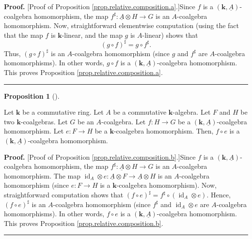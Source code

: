 \documentclass
[numbers=enddot,12pt,final,onecolumn,notitlepage,abstracton]{scrartcl}%
\theoremstyle{definition}
\newtheorem{prop}[theo]{Proposition}
\newenvironment{proposition}[1][]
{\begin{prop}[#1]\begin{leftbar}}
{\end{leftbar}\end{prop}}
\newenvironment{proof}[1][Proof]{\noindent\textbf{#1.} }{\ \rule{0.5em}{0.5em}}
\begin{document}
\begin{proof}
[Proof of Proposition \ref{prop.relative.composition.a}.]Since $f$ is a
$\left(  \mathbf{k},\underline{A}\right)  $-coalgebra homomorphism, the map
$f^{\sharp}:\underline{A}\otimes H\rightarrow G$ is an $A$-coalgebra
homomorphism. Now, straightforward elementwise computation (using the fact
that the map $f$ is $\mathbf{k}$-linear, and the map $g$ is $A$-linear) shows
that
\begin{equation}
\left(  g\circ f\right)  ^{\sharp}=g\circ f^{\sharp}.
\label{pf.prop.relative.composition.a.1}%
\end{equation}
Thus, $\left(  g\circ f\right)  ^{\sharp}$ is an $A$-coalgebra homomorphism
(since $g$ and $f^{\sharp}$ are $A$-coalgebra homomorphisms). In other words,
$g\circ f$ is a $\left(  \mathbf{k},\underline{A}\right)  $-coalgebra
homomorphism. This proves Proposition \ref{prop.relative.composition.a}.
\end{proof}

\begin{proposition}
\label{prop.relative.composition.b}Let $\mathbf{k}$ be a commutative ring. Let
$A$ be a commutative $\mathbf{k}$-algebra. Let $F$ and $H$ be two $\mathbf{k}%
$-coalgebras. Let $G$ be an $A$-coalgebra. Let $f:H\rightarrow G$ be a
$\left(  \mathbf{k},\underline{A}\right)  $-coalgebra homomorphism. Let
$e:F\rightarrow H$ be a $\mathbf{k}$-coalgebra homomorphism. Then, $f\circ e$
is a $\left(  \mathbf{k},\underline{A}\right)  $-coalgebra homomorphism.
\end{proposition}

\begin{proof}
[Proof of Proposition \ref{prop.relative.composition.b}.]Since $f$ is a
$\left(  \mathbf{k},\underline{A}\right)  $-coalgebra homomorphism, the map
$f^{\sharp}:\underline{A}\otimes H\rightarrow G$ is an $A$-coalgebra
homomorphism. The map $\operatorname*{id}\nolimits_{A}\otimes e:\underline{A}%
\otimes F\rightarrow\underline{A}\otimes H$ is an $A$-coalgebra homomorphism
(since $e:F\rightarrow H$ is a $\mathbf{k}$-coalgebra homomorphism). Now,
straightforward computation shows that $\left(  f\circ e\right)  ^{\sharp
}=f^{\sharp}\circ\left(  \operatorname*{id}\nolimits_{A}\otimes e\right)  $.
Hence, $\left(  f\circ e\right)  ^{\sharp}$ is an $A$-coalgebra homomorphism
(since $f^{\sharp}$ and $\operatorname*{id}\nolimits_{A}\otimes e$ are
$A$-coalgebra homomorphisms). In other words, $f\circ e$ is a $\left(
\mathbf{k},\underline{A}\right)  $-coalgebra homomorphism. This proves
Proposition \ref{prop.relative.composition.b}.
\end{proof}
\end{document}
